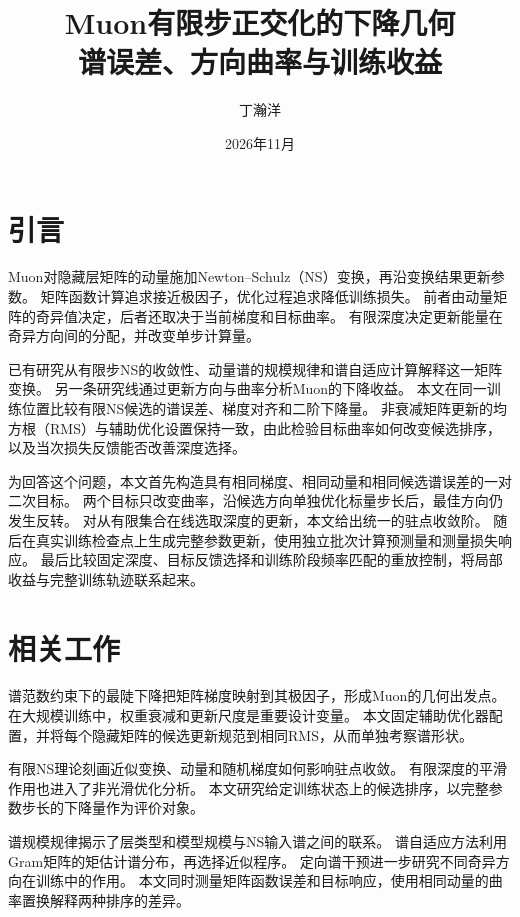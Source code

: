 \documentclass[UTF8,a4paper,11pt]{ctexart}
\title{Muon有限步正交化的下降几何\\[0.3em]谱误差、方向曲率与训练收益}
\author{丁瀚洋}
\date{2026年11月}
\begin{document}
\maketitle
\begin{abstract}

\end{abstract}
\section{引言}
Muon对隐藏层矩阵的动量施加Newton--Schulz（NS）变换，再沿变换结果更新参数\cite{jordan2024muon}。
矩阵函数计算追求接近极因子，优化过程追求降低训练损失。
前者由动量矩阵的奇异值决定，后者还取决于当前梯度和目标曲率。
有限深度决定更新能量在奇异方向间的分配，并改变单步计算量。

已有研究从有限步NS的收敛性\cite{kim2026muonns,wang2026practical}、动量谱的规模规律\cite{magakyan2026spectral}和谱自适应计算\cite{topollai2026costfree}解释这一矩阵变换。
另一条研究线通过更新方向与曲率分析Muon的下降收益\cite{wang2026curvature}。
本文在同一训练位置比较有限NS候选的谱误差、梯度对齐和二阶下降量。
非衰减矩阵更新的均方根（RMS）与辅助优化设置保持一致，由此检验目标曲率如何改变候选排序，以及当次损失反馈能否改善深度选择。

为回答这个问题，本文首先构造具有相同梯度、相同动量和相同候选谱误差的一对二次目标。
两个目标只改变曲率，沿候选方向单独优化标量步长后，最佳方向仍发生反转。
对从有限集合在线选取深度的更新，本文给出统一的驻点收敛阶。
随后在真实训练检查点上生成完整参数更新，使用独立批次计算预测量和测量损失响应。
最后比较固定深度、目标反馈选择和训练阶段频率匹配的重放控制，将局部收益与完整训练轨迹联系起来。



\section{相关工作}
谱范数约束下的最陡下降把矩阵梯度映射到其极因子，形成Muon的几何出发点\cite{bernstein2024norm}。
在大规模训练中，权重衰减和更新尺度是重要设计变量\cite{liu2025scalable}。
本文固定辅助优化器配置，并将每个隐藏矩阵的候选更新规范到相同RMS，从而单独考察谱形状。

有限NS理论刻画近似变换、动量和随机梯度如何影响驻点收敛\cite{kim2026muonns,wang2026practical,peng2026finitens}。
有限深度的平滑作用也进入了非光滑优化分析\cite{li2026smoothing}。
本文研究给定训练状态上的候选排序，以完整参数步长的下降量作为评价对象。

谱规模规律揭示了层类型和模型规模与NS输入谱之间的联系\cite{magakyan2026spectral}。
谱自适应方法利用Gram矩阵的矩估计谱分布，再选择近似程序\cite{topollai2026costfree}。
定向谱干预进一步研究不同奇异方向在训练中的作用\cite{goyal2026targeted}。
本文同时测量矩阵函数误差和目标响应，使用相同动量的曲率置换解释两种排序的差异。
\end{document}
